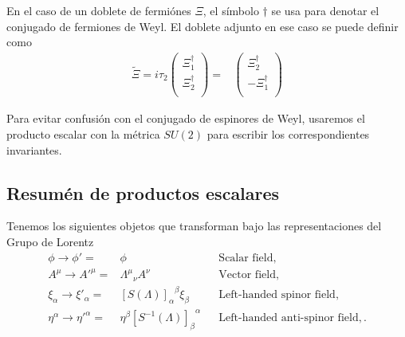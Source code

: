 En el caso de un doblete de fermiónes $\Xi$, el símbolo  $\dagger$ se usa para denotar el conjugado de fermiones de Weyl. El doblete adjunto en ese caso se puede definir como
\begin{align}
\label{eq:Xiadj}
 \widetilde{\Xi}=i\tau_2 \begin{pmatrix}
                  \Xi_1^{\dagger}\\
                  \Xi_2^{\dagger}\\
                \end{pmatrix}
=& \begin{pmatrix}
                  \Xi_2^{\dagger}\\
                 -\Xi_1^{\dagger}\\
                \end{pmatrix}
\end{align}

Para evitar confusión con el conjugado de espinores de Weyl, usaremos el producto escalar con la métrica $SU(2)$ para escribir los correspondientes invariantes.


\subsection{Resumén de productos escalares}

\begin{frame}
Tenemos los siguientes objetos que transforman bajo las representaciones del Grupo de Lorentz
\begin{align}
   \phi\to \phi'=&\phi && \text{Scalar field,}\nonumber\\
   A^\mu\to {A'}^\mu=&{\Lambda^\mu}_\nu A^\nu&&\text{Vector field,}\nonumber\\
  \xi_\alpha\to\xi'_\alpha=&{\left[ S(\Lambda) \right]_\alpha}^\beta\xi_\beta
&& \text{Left-handed spinor field,}\nonumber\\
\eta^{\alpha}\to {\eta'}^{\alpha} =&\eta^\beta{\left[  S^{-1}(\Lambda)  \right]_{\beta}}^{\alpha}&&
 \text{Left-handed anti-spinor field,}\,.
 \end{align}
\end{frame}



